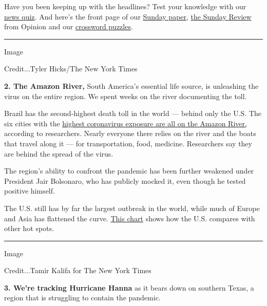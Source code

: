 Have you been keeping up with the headlines? Test your knowledge with
our
\href{https://www.nytimes3xbfgragh.onion/interactive/2020/07/24/briefing/federal-agents-john-lewis-mars-news-quiz.html}{news
quiz}. And here's the front page of our
\href{https://static01.graylady3jvrrxbe.onion/images/2020/07/26/nytfrontpage/scan.pdf}{Sunday
paper},
\href{https://www.nytimes3xbfgragh.onion/section/opinion/sunday}{the
Sunday Review} from Opinion and our
\href{https://www.nytimes3xbfgragh.onion/crosswords}{crossword puzzles}.

\begin{center}\rule{0.5\linewidth}{\linethickness}\end{center}

Image

Credit...Tyler Hicks/The New York Times

\textbf{2. The Amazon River,} South America's essential life source, is
unleashing the virus on the entire region. We spent weeks on the river
documenting the toll.

Brazil has the second-highest death toll in the world --- behind only
the U.S. The six cities with the
\href{https://www.nytimes3xbfgragh.onion/interactive/2020/07/25/world/americas/coronavirus-brazil-amazon.html?}{highest
coronavirus exposure are all on the Amazon River,} according to
researchers. Nearly everyone there relies on the river and the boats
that travel along it --- for transportation, food, medicine. Researchers
say they are behind the spread of the virus.

The region's ability to confront the pandemic has been further weakened
under President Jair Bolsonaro, who has publicly mocked it, even though
he tested positive himself.

The U.S. still has by far the largest outbreak in the world, while much
of Europe and Asia has flattened the curve.
\href{https://www.nytimes3xbfgragh.onion/interactive/2020/07/23/us/coronavirus-hotspots-countries.html?}{This
chart} shows how the U.S. compares with other hot spots.

\begin{center}\rule{0.5\linewidth}{\linethickness}\end{center}

Image

Credit...Tamir Kalifa for The New York Times

\textbf{3. We're tracking Hurricane Hanna} as it bears down on southern
Texas, a region that is struggling to contain the pandemic.

